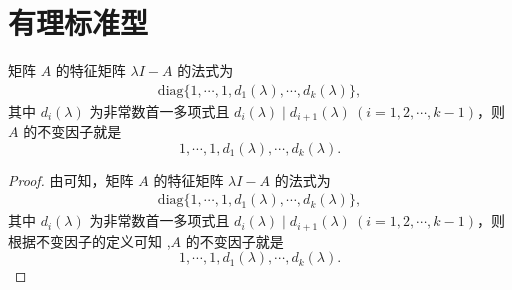 \documentclass[../../main.tex]{subfiles}
\begin{document}
\section{有理标准型}

\begin{proposition}\label{proposition:特征矩阵的法式和不变因子}
矩阵 $A$ 的特征矩阵 $\lambda I - A$ 的法式为
\begin{align*}
\mathrm{diag}\{1,\cdots,1,d_1(\lambda),\cdots,d_k(\lambda)\},
\end{align*}
其中 $d_i(\lambda)$ 为非常数首一多项式且 $d_i(\lambda)\mid d_{i + 1}(\lambda)\ (i = 1, 2, \cdots, k - 1)$，则 $A$ 的不变因子就是
\[
1,\cdots,1,d_1(\lambda),\cdots,d_k(\lambda).
\] 
\end{proposition}
\begin{proof}
由可知，矩阵 $A$ 的特征矩阵 $\lambda I - A$ 的法式为
\begin{align*}
\mathrm{diag}\{1,\cdots,1,d_1(\lambda),\cdots,d_k(\lambda)\},
\end{align*}
其中 $d_i(\lambda)$ 为非常数首一多项式且 $d_i(\lambda)\mid d_{i + 1}(\lambda)\ (i = 1, 2, \cdots, k - 1)$，则根据不变因子的定义可知 ,$A$ 的不变因子就是
\[
1,\cdots,1,d_1(\lambda),\cdots,d_k(\lambda).
\] 
\end{proof}
\end{document}
